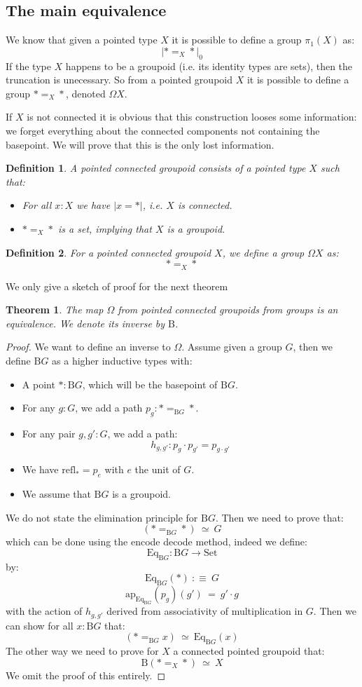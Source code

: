 \documentclass{article}
\newcommand{\sse}[1]{\medbreak \subsection{#1}}
\renewcommand{\r}{\rightarrow}
\newcommand{\ap}{\mathrm{ap}}
\newcommand{\refl}{\mathrm{refl}}
\newcommand{\B}{\mathrm{B}}
\newcommand{\Set}{\mathrm{Set}}
\newcommand{\Eq}{\mathrm{Eq}}
\newtheorem{definition}{Definition}
\newtheorem{theorem}{Theorem}
\begin{document}
\sse{The main equivalence}

We know that given a pointed type $X$ it is possible to define a group $\pi_1(X)$ as: 
\[|*=_X*|_0\] If the type $X$ happens to be a groupoid (i.e. its identity types are sets), then the truncation is unecessary. So from a pointed groupoid $X$ it is possible to define a group $*=_X*$, denoted $\Omega X$. 

If $X$ is not connected it is obvious that this construction looses some information: we forget everything about the connected components not containing the basepoint. We will prove that this is the only lost information.

\begin{definition}
A pointed connected groupoid consists of a pointed type $X$ such that:
\begin{itemize}
\item For all $x:X$ we have $|x=*|$, i.e. $X$ is connected.
\item $*=_{X}*$ is a set, implying that $X$ is a groupoid.
\end{itemize}
\end{definition}

\begin{definition}
For a pointed connected groupoid $X$, we define a group $\Omega X$ as:
\[*=_X*\]
\end{definition}

We only give a sketch of proof for the next theorem

\begin{theorem}
The map $\Omega$ from pointed connected groupoids from groups is an equivalence. We denote its inverse by $\B$.
\end{theorem}
\begin{proof}
We want to define an inverse to $\Omega$. Assume given a group $G$, then we define $\B G$ as a higher inductive types with:
\begin{itemize}
\item A point $*:\B G$, which will be the basepoint of $\B G$.
\item For any $g:G$, we add a path $p_g : *=_{\B G}*$.
\item For any pair $g,g':G$, we add a path:
\[h_{g,g'} : p_g \cdot p_{g'} = p_{g\cdot g'}\]
\item We have $\refl_* = p_e$ with $e$ the unit of $G$.
\item We assume that $\B G$ is a groupoid.
\end{itemize}
We do not state the elimination principle for $\B G$. Then we need to prove that: 
\[(*=_{\B G}*)\ \simeq\ G \]
which can be done using the encode decode method, indeed we define: 
\[\Eq_{\B G} : \B G \r \Set\] 
by:
\[\Eq_{\B G}(*)\ :\equiv\ G\]
\[\ap_{\Eq_{\B G}}(p_g)(g') \ = \ g'\cdot g\]
with the action of $h_{g,g'}$ derived from associativity of multiplication in $G$. Then we can show for all $x:\B G$ that:
\[(*=_{\B G}x)\ \simeq\ \Eq_{\B G}(x) \]
The other way we need to prove for $X$ a connected pointed groupoid that:
\[\B(*=_X*) \ \simeq\ X\]
We omit the proof of this entirely.
\end{proof}
\end{document}
